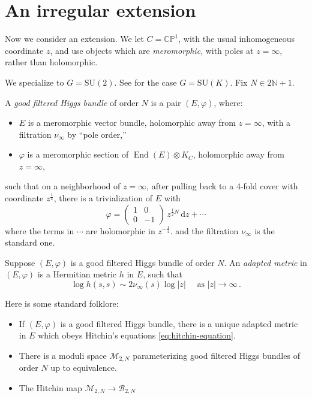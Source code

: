 \documentclass[12pt,letterpaper,reqno]{article}
\numberwithin{equation}{section}
\newcommand{\cB}{\ensuremath{\mathcal B}}
\newcommand{\cM}{\ensuremath{\mathcal M}}
\newcommand{\bbC}{\ensuremath{\mathbb C}}
\newcommand{\bbN}{\ensuremath{\mathbb N}}
\newcommand{\bbP}{\ensuremath{\mathbb P}}
\newcommand{\de}{\mathrm{d}}
\newcommand{\abs}[1]{\lvert#1\rvert}
\newcommand{\ti}[1]{\textit{#1}}
\DeclareMathOperator{\End}{End}
\newcommand{\SU}{\mathrm{SU}}
\newcommand{\fixme}[1]{{\color{orange}{[#1]}}}
\begin{document}
\section{An irregular extension} \label{sec:irregular-extension}

Now we consider an extension.
We let $C = \bbC\bbP^1$, with the usual inhomogeneous coordinate $z$, 
and use objects which are \ti{meromorphic},
with poles at $z = \infty$, rather than holomorphic.

We specialize to $G = \SU(2)$. See \cite{Fredrickson2017} for the case
$G = \SU(K)$. Fix $N \in 2 \bbN + 1$.

\begin{defn}
A \ti{good filtered Higgs bundle} of order $N$ is
a pair $(E,\varphi)$, where:
\begin{itemize} 
  \item $E$ is a 
meromorphic vector bundle, holomorphic away from 
$z = \infty$, 
with a filtration $\nu_\infty$
by ``pole order,'' 
 \item $\varphi$ is a meromorphic section of $\End(E) \otimes K_C$,
 holomorphic away from $z = \infty$,
\end{itemize}
such that on a neighborhood of $z = \infty$,
after pulling back to a 4-fold cover with coordinate $z^{\frac14}$,
there is a trivialization of $E$ with
\begin{equation}
  \varphi = \begin{pmatrix} 1 & 0 \\ 0 & -1 \end{pmatrix} \, z^{\frac12 N} \, \de z + \cdots
\end{equation}
where the terms in $\cdots$ are holomorphic in $z^{- \frac14}$.
and the filtration $\nu_\infty$ is the standard one.
\end{defn}

\begin{defn}
Suppose $(E,\varphi)$ is a good filtered Higgs bundle of order $N$. An \ti{adapted metric} in $(E,\varphi)$ is a Hermitian metric $h$ in $E$, such that
\begin{equation}
\log h(s,s) \sim 2 \nu_\infty(s) \log \abs{z} \quad \text{ as } \abs{z} \to \infty \, . 
\end{equation}
\end{defn}

Here is some standard folklore:
\begin{itemize}
\item If $(E,\varphi)$ is a good filtered Higgs bundle, there is a 
unique adapted metric in $E$ which obeys Hitchin's equations \eqref{eq:hitchin-equation}. \fixme{Biquard-Boalch plus epsilon}

\item There is a moduli space $\cM_{2,N}$ parameterizing good filtered
Higgs bundles of order $N$ up to equivalence.

\item The Hitchin map $\cM_{2,N} \to \cB_{2,N}$
\end{itemize}
\end{document}
